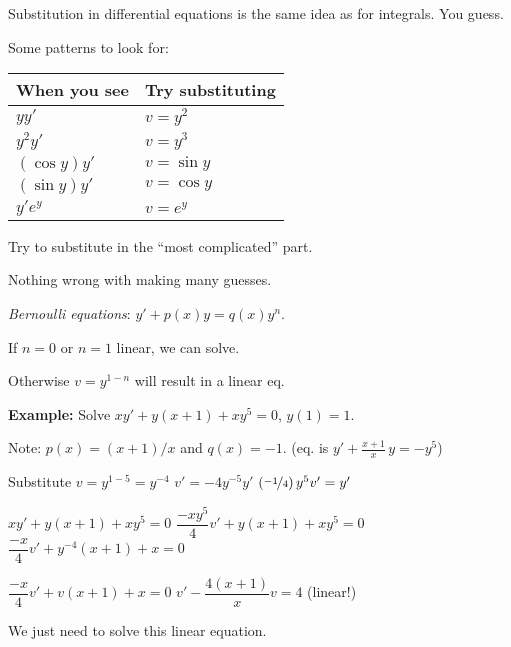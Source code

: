 \documentclass[10pt,aspectratio=169]{beamer}
\begin{document}
\begin{frame}

Substitution in differential equations
is the same idea as for integrals.  You guess.

\medskip
\pause

Some patterns to look for:

\begin{center}
\begin{tabular}{@{}ll@{}}
\toprule
When you see & Try substituting \\
\midrule
$yy'$ & $v=y^2$ \\
$y^2y'$ & $v=y^3$ \\
$(\cos y)y'$ & $v=\sin y$ \\
$(\sin y)y'$ & $v=\cos y$ \\
$y'e^y$ & $v=e^y$ \\ \bottomrule
\end{tabular}
\end{center}

\pause

Try to substitute in the ``most complicated'' part.

\medskip
\pause

Nothing wrong with making many guesses.

\end{frame}

\begin{frame}
\emph{Bernoulli equations}:
\quad $y' + p(x)y = q(x)y^n$.

\medskip
\pause

If $n=0$ or $n=1$ \wthus linear, we can solve.

\medskip
\pause

Otherwise $v=y^{1-n}$ will result in a linear eq.

\medskip
\pause

\textbf{Example:}
Solve
\quad
$xy'+ y(x+1)+xy^5 = 0$, \qquad $y(1)=1$.

\medskip
\pause

Note: $p(x) = (x+1)/x$ and $q(x) = -1$. \qquad (eq. is $y' + \frac{x+1}{x} \, y =
-y^5$)

\medskip
\pause

Substitute
$v=y^{1-5} = y^{-4}$
\pause
\wthus
$v' = -4 y^{-5} y'$
\pause
\wthus
$\left( \nicefrac{-1}{4} \right) y^5 v' = y'$

\medskip
\pause

$xy'+ y(x+1)+xy^5 = 0$
\pause
\wthus
$\dfrac{-xy^5}{4} v'+ y(x+1)+xy^5 = 0$
\pause
\wthus
$\dfrac{-x}{4} v'+ y^{-4}(x+1)+x = 0$

\medskip

\pause
\wthus
$\dfrac{-x}{4} v'+ v(x+1)+x = 0$
\pause
\wthus
$v'- \dfrac{4(x+1)}{x} v  = 4$
\pause
\quad (linear!)

\medskip
\pause

We just need to solve this linear equation.

\end{frame}
\end{document}
